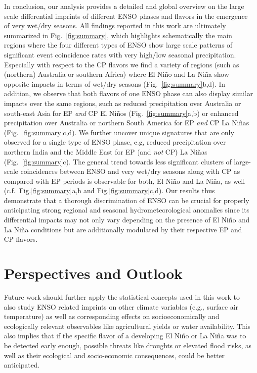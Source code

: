 \documentclass[utf8]{frontiersSCNS} %
\begin{document}
In conclusion, our analysis provides a detailed and global overview on the large scale differential imprints of different ENSO phases and flavors in the emergence of very wet/dry seasons. All findings reported in this work are ultimately summarized in Fig.~\ref{fig:summary}, which highlights schematically the main regions where the four different types of ENSO show large scale patterns of significant event coincidence rates with very high/low seasonal precipitation. Especially with respect to the CP flavors we find a variety of regions (such as (northern) Australia or southern Africa) where El Ni\~no and La Ni\~na show opposite impacts in terms of wet/dry seasons (Fig.~\ref{fig:summary}b,d). In addition, we observe that both flavors of one ENSO phase can also display similar impacts over the same regions, such as reduced precipitation over Australia or south-east Asia for EP {\em{and}} CP El Ni\~nos (Fig.~\ref{fig:summary}a,b) or enhanced precipitation over Australia or northern South America for EP {\em{and}} CP La Ni\~nas (Fig.~\ref{fig:summary}c,d). We further uncover unique signatures that are only observed for a single type of ENSO phase, e.g, reduced precipitation over northern India and the Middle East for EP (and {\em{not}} CP) La Ni\~nas (Fig.~\ref{fig:summary}c). The general trend towards less significant clusters of large-scale coincidences between ENSO and very wet/dry seasons along with CP as compared with EP periods is observable for both, El Ni\~no and La Ni\~na, as well (c.f.\ Fig.\ref{fig:summary}a,b and Fig.\ref{fig:summary}c,d). Our results thus demonstrate that a thorough discrimination of ENSO can be crucial for properly anticipating strong regional and seasonal hydrometeorological anomalies since its differential impacts may not only vary depending on the presence of El Ni\~no and La Ni\~na conditions but are additionally modulated by their respective EP and CP flavors.

\section{Perspectives and Outlook}

Future work should further apply the statistical concepts used in this work to also study ENSO related imprints on other climate variables (e.g., surface air temperature) as well as corresponding effects on socioeconomically and ecologically relevant observables like agricultural yields or water availability. This also implies that if the specific flavor of a developing El Ni\~no or La Ni\~na was to be detected early enough, possible threats like droughts or elevated flood risks, as well as their ecological and socio-economic consequences, could be better anticipated. 
\end{document}

